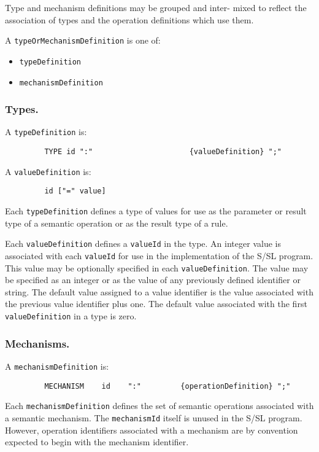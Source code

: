 Type and mechanism definitions may be grouped and  inter-
mixed  to reflect the association of types and the operation
definitions which use them.

A {\tt typeOrMechanismDefinition} is one of:
\begin{itemize}
\item {\tt typeDefinition}
\item {\tt mechanismDefinition}
\end{itemize}





\subsubsection{Types.}

A {\tt typeDefinition} is:
\begin{verbatim}
         TYPE id ":"                      {valueDefinition} ";"
\end{verbatim}


A {\tt valueDefinition} is:
\begin{verbatim}
         id ["=" value]
\end{verbatim}


Each {\tt typeDefinition} defines a type of values for  use  as
the  parameter  or result type of a semantic operation or as
the result type of a rule.

Each {\tt valueDefinition} defines a {\tt valueId} in the  type. An
integer value is associated with each {\tt valueId} for use in the
implementation of the  S/SL  program.   This  value  may  be
optionally specified in each {\tt valueDefinition}.  The value may
be specified as an integer or as the value of any previously
defined identifier or string.  The default value assigned to
a value identifier is the value associated with the previous
value  identifier  plus  one.   The default value associated
with the first {\tt valueDefinition} in a type is zero.


\subsubsection{Mechanisms.}

A {\tt mechanismDefinition} is:
\begin{verbatim}
         MECHANISM    id    ":"         {operationDefinition} ";"
\end{verbatim}

Each {\tt mechanismDefinition}  defines  the  set        of semantic
operations associated with a semantic mechanism.  The 
{\tt mechanismId} itself is unused in the S/SL program.  However, 
operation identifiers associated with a mechanism are by 
convention expected to begin with the mechanism identifier.

